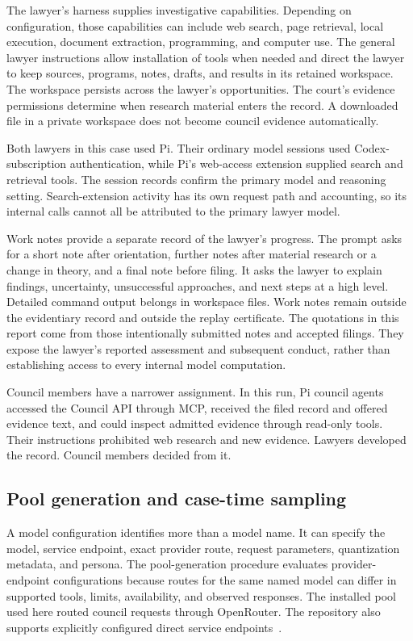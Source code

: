 \documentclass[11pt]{article}
\begin{document}
The lawyer's harness supplies investigative capabilities.  Depending on configuration, those capabilities can include web search, page retrieval, local execution, document extraction, programming, and computer use.  The general lawyer instructions allow installation of tools when needed and direct the lawyer to keep sources, programs, notes, drafts, and results in its retained workspace.  The workspace persists across the lawyer's opportunities.  The court's evidence permissions determine when research material enters the record.  A downloaded file in a private workspace does not become council evidence automatically.

Both lawyers in this case used Pi.  Their ordinary model sessions used Codex-subscription authentication, while Pi's web-access extension supplied search and retrieval tools.  The session records confirm the primary model and reasoning setting.  Search-extension activity has its own request path and accounting, so its internal calls cannot all be attributed to the primary lawyer model.

Work notes provide a separate record of the lawyer's progress.  The prompt asks for a short note after orientation, further notes after material research or a change in theory, and a final note before filing.  It asks the lawyer to explain findings, uncertainty, unsuccessful approaches, and next steps at a high level.  Detailed command output belongs in workspace files.  Work notes remain outside the evidentiary record and outside the replay certificate.  The quotations in this report come from those intentionally submitted notes and accepted filings.  They expose the lawyer's reported assessment and subsequent conduct, rather than establishing access to every internal model computation.

Council members have a narrower assignment.  In this run, Pi council agents accessed the Council API through MCP, received the filed record and offered evidence text, and could inspect admitted evidence through read-only tools.  Their instructions prohibited web research and new evidence.  Lawyers developed the record.  Council members decided from it.

\subsection{Pool generation and case-time sampling}
\label{sec:pool}

A model configuration identifies more than a model name.  It can specify the model, service endpoint, exact provider route, request parameters, quantization metadata, and persona.  The pool-generation procedure evaluates provider-endpoint configurations because routes for the same named model can differ in supported tools, limits, availability, and observed responses.  The installed pool used here routed council requests through OpenRouter.  The repository also supports explicitly configured direct service endpoints~\cite{endpoints}.
\end{document}
